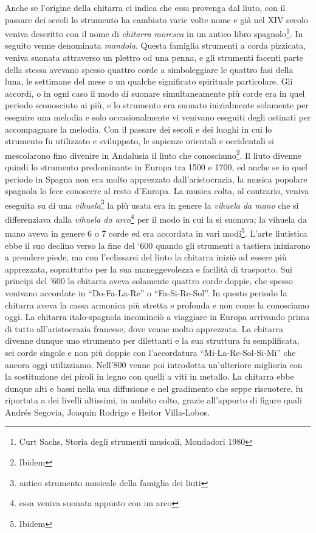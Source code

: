 \documentclass[oneside]{article}
\begin{document}
\begin{multicols*}{2}
\noindent
Anche se l’origine della chitarra ci indica che essa provenga dal liuto, con il passare dei secoli lo strumento ha cambiato varie volte nome e già nel XIV secolo veniva descritto con il nome di \textit{chitarra moresca} in un antico libro spagnolo\footnote{Curt Sachs, Storia degli strumenti musicali, Mondadori 1980}. In seguito venne denominata \textit{mandola}.
Questa famiglia strumenti a corda pizzicata, veniva suonata attraverso un plettro od una penna, e gli strumenti facenti parte della stessa avevano spesso quattro corde a simboleggiare le quattro fasi della luna, le settimane del mese o un qualche significato spirituale particolare. Gli accordi, o in ogni caso il modo di suonare simultaneamente più corde era in quel periodo sconosciuto ai più, e lo strumento era suonato inizialmente solamente per eseguire una melodia e solo occasionalmente vi venivano eseguiti degli ostinati per accompagnare la melodia. Con il passare dei secoli e dei luoghi in cui lo strumento fu utilizzato e sviluppato, le sapienze orientali e occidentali si mescolarono fino divenire in Andalusia il liuto che conosciamo\footnote{Ibidem}.
Il liuto divenne quindi lo strumento predominante in Europa tra 1500 e 1700,  ed anche se in quel periodo in Spagna non era molto apprezzato dall’aristocrazia, la musica popolare spagnola lo fece conoscere al resto d’Europa. La musica colta, al contrario, veniva eseguita su di una \textit{vihuela}\footnote{antico strumento musicale della famiglia dei liuti} la più usata era in genere la \textit{vihuela da mano} che si differenziava dalla \textit{vihuela da arco}\footnote{essa veniva suonata appunto con un arco} per il modo in cui la si suonava; la vihuela da mano aveva in genere 6 o 7 corde ed era accordata in vari modi\footnote{Ibidem}.\newline
L’arte liutistica ebbe il suo declino verso la fine del ‘600 quando gli strumenti a tastiera iniziarono a prendere piede, ma con l'eclissarsi del liuto la chitarra iniziò ad essere più apprezzata, soprattutto per la sua maneggevolezza e facilità di trasporto.
Sui principi del '600 la chitarra aveva solamente quattro corde doppie, che spesso venivano accordate in “Do-Fa-La-Re” o “Fa-Si-Re-Sol”. 
In questo periodo la chitarra aveva la cassa armonica più stretta e profonda e non come la conosciamo oggi.
La chitarra italo-spagnola incominciò a viaggiare in Europa arrivando prima di tutto all’aristocrazia francese, dove venne molto apprezzata.
La chitarra divenne dunque uno strumento per dilettanti e la sua struttura fu semplificata, sei corde singole e non più doppie con l'accordatura “Mi-La-Re-Sol-Si-Mi” che ancora oggi utilizziamo.
Nell’800 venne poi introdotta un'ulteriore miglioria con la sostituzione dei piroli in legno con quelli a viti in metallo.\newline
La chitarra ebbe dunque alti e bassi nella sua diffusione e nel gradimento che seppe riscuotere, fu riportata a dei livelli altissimi, in ambito colto, grazie all’apporto di figure quali Andrés Segovia, Joaquin Rodrigo e Heitor Villa-Lobos.



\end{multicols*}
\end{document}
